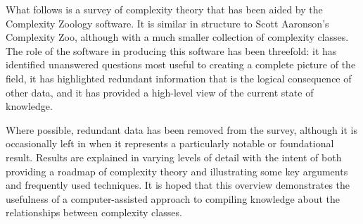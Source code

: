 What follows is a survey of complexity theory that has been aided by the
Complexity Zoology software. It is similar in structure to Scott Aaronson's
Complexity Zoo, although with a much smaller collection of complexity
classes. The role of the software in producing this software has been threefold:
it has identified unanswered questions most useful to creating a complete
picture of the field, it has highlighted redundant information that is the
logical consequence of other data, and it has provided a high-level view of the
current state of knowledge.

Where possible, redundant data has been removed from the survey, although it is 
occasionally left in when it represents a particularly notable or foundational result. 
Results are explained in varying levels of detail with the intent of both providing a
roadmap of complexity theory and illustrating some key arguments and frequently used
techniques. It is hoped that this overview demonstrates the usefulness of a
computer-assisted approach to compiling knowledge about the relationships
between complexity classes.